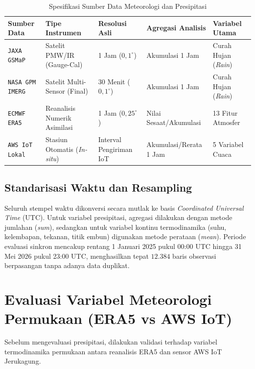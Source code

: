 \documentclass[11pt,a4paper]{article}
\begin{document}
\begin{table}[htbp]
\centering
\small
\caption{Spesifikasi Sumber Data Meteorologi dan Presipitasi}
\label{tab:data_specs}
\begin{tabular*}{\textwidth}{@{\extracolsep{\fill}}lllll@{}}
\toprule
\textbf{Sumber Data} & \textbf{Tipe Instrumen} & \textbf{Resolusi Asli} & \textbf{Agregasi Analisis} & \textbf{Variabel Utama} \\
\midrule
\texttt{JAXA GSMaP} & Satelit PMW/IR (Gauge-Cal) & 1 Jam ($0{,}1^\circ$) & Akumulasi 1 Jam & Curah Hujan (\textit{Rain}) \\
\texttt{NASA GPM IMERG} & Satelit Multi-Sensor (Final) & 30 Menit ($0{,}1^\circ$) & Akumulasi 1 Jam & Curah Hujan (\textit{Rain}) \\
\texttt{ECMWF ERA5} & Reanalisis Numerik Asimilasi & 1 Jam ($0{,}25^\circ$) & Nilai Sesaat/Akumulasi & 13 Fitur Atmosfer \\
\texttt{AWS IoT Lokal} & Stasiun Otomatis (\textit{In-situ}) & Interval Pengiriman IoT & Akumulasi/Rerata 1 Jam & 5 Variabel Cuaca \\
\bottomrule
\end{tabular*}
\end{table}

\subsection{Standarisasi Waktu dan Resampling}
Seluruh stempel waktu dikonversi secara mutlak ke basis \textit{Coordinated Universal Time} (UTC). Untuk variabel presipitasi, agregasi dilakukan dengan metode jumlahan (\textit{sum}), sedangkan untuk variabel kontinu termodinamika (suhu, kelembapan, tekanan, titik embun) digunakan metode perataan (\textit{mean}). Periode evaluasi sinkron mencakup rentang 1 Januari 2025 pukul 00:00 UTC hingga 31 Mei 2026 pukul 23:00 UTC, menghasilkan tepat $12.384$ baris observasi berpasangan tanpa adanya data duplikat.

\section{Evaluasi Variabel Meteorologi Permukaan (ERA5 vs AWS IoT)}
Sebelum mengevaluasi presipitasi, dilakukan validasi terhadap variabel termodinamika permukaan antara reanalisis ERA5 dan sensor AWS IoT Jerukagung.
\end{document}
